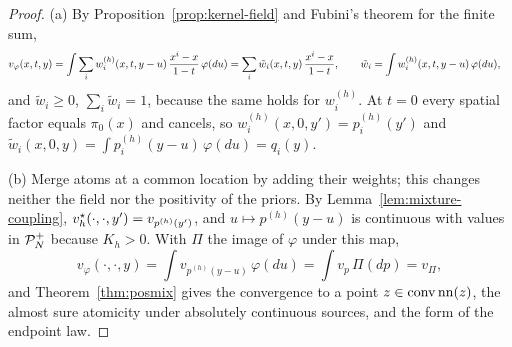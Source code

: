 \documentclass{article} %
\newcommand{\iclrstart}{\begin{aligned}&}\newcommand{\iclrend}{\end{aligned}}
\newcommand{\iclrallow}{\allowbreak}
\newcommand{\iclrstart}{}\newcommand{\iclrend}{}\newcommand{\iclrallow}{}
\theoremstyle{plain}
\theoremstyle{definition}
\theoremstyle{remark}
\begin{document}
\label{apx:pf-filtered}
\propfiltered*
\begin{proof}
(a) By Proposition~\ref{prop:kernel-field} and Fubini's theorem for the finite sum,
\[
\iclrstart v_\varphi(x,t,y)=\int\sum_iw_i^{(h)}(x,t,y-u)\,\frac{x^i-x}{1-t}\,\varphi(du)
\iclrbrq=\sum_i\tilde w_i(x,t,y)\,\frac{x^i-x}{1-t},\iclrqbr
\tilde w_i=\int w_i^{(h)}(x,t,y-u)\,\varphi(du),\iclrend
\]
and $\tilde w_i\ge0$, $\sum_i\tilde w_i=1$, because the same holds for $w_i^{(h)}$. At $t=0$ every
spatial factor equals $\pi_0(x)$ and cancels, so $w_i^{(h)}(x,0,y')=p_i^{(h)}(y')$ and
$\tilde w_i(x,0,y)=\int p_i^{(h)}(y-u)\,\varphi(du)=q_i(y)$.

(b) Merge atoms at a common location by adding their weights; this changes neither the field nor
the positivity of the priors. By Lemma~\ref{lem:mixture-coupling},
$v_h^\star(\cdot,\cdot,y')=v_{p^{(h)}(y')}$, and $u\mapsto p^{(h)}(y-u)$ is continuous with values in
$\mathcal{P}_N^{+}$ because $K_h>0$. With $\Pi$ the image of $\varphi$ under this map,
\[
v_\varphi(\cdot,\cdot,y)=\int v_{p^{(h)}(y-u)}\,\varphi(du)=\int v_p\,\Pi(dp)=v_\Pi ,
\]
and Theorem~\ref{thm:posmix} gives the convergence to a point $z\in\operatorname{conv}\operatorname{nn}(z)$, the
almost sure atomicity under absolutely continuous sources, and the form of the endpoint law.
\end{proof}
\end{document}
